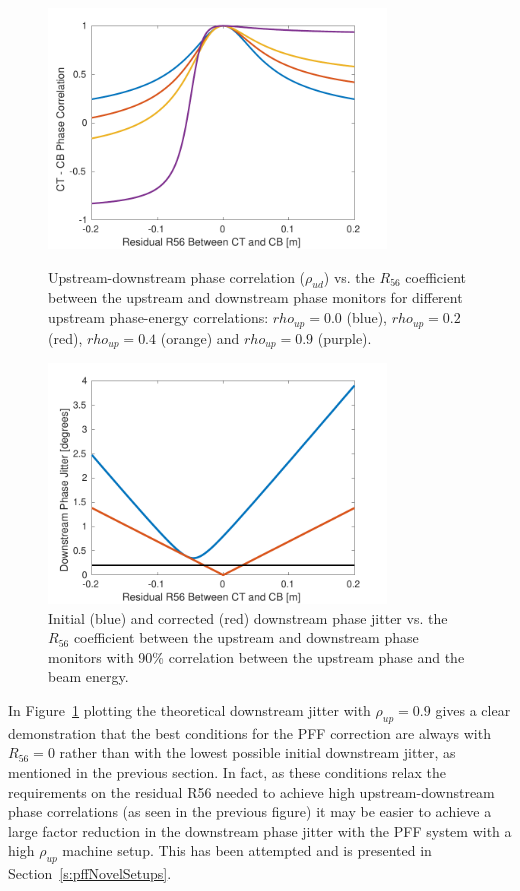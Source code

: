 \begin{figure}
  \centering
  \includegraphics[width=0.8\textwidth]{Figures/propagation/corrVsR56_CTENCorr}
  \caption{Upstream-downstream phase correlation (\(\rho_{ud}\)) vs. the \(R_{56}\) coefficient between the upstream and downstream phase monitors for different upstream phase-energy correlations: \(rho_{up}=0.0\) (blue), \(rho_{up}=0.2\) (red), \(rho_{up}=0.4\) (orange) and \(rho_{up}=0.9\) (purple).}
  \label{f:corrVsR56_CTENCorr}
  \includegraphics[width=0.8\textwidth]{Figures/propagation/jitVsR56_90ctencorr}
  \caption{Initial (blue) and corrected (red) downstream phase jitter vs. the \(R_{56}\) coefficient between the upstream and downstream phase monitors with 90\% correlation between the upstream phase and the beam energy.}
  \label{f:jitVsR56_90ctencorr}
\end{figure}


In Figure~\ref{f:jitVsR56_90ctencorr} plotting the theoretical downstream jitter with \(\rho_{up} = 0.9\) gives a clear demonstration that the best conditions for the PFF correction are always with \(R_{56} = 0\) rather than with the lowest possible initial downstream jitter, as mentioned in the previous section. In fact, as these conditions relax the requirements on the residual R56 needed to achieve high upstream-downstream phase correlations (as seen in the previous figure) it may be easier to achieve a large factor reduction in the downstream phase jitter with the PFF system with a high \(\rho_{up}\) machine setup. This has been attempted and is presented in Section~\ref{s:pffNovelSetups}.



